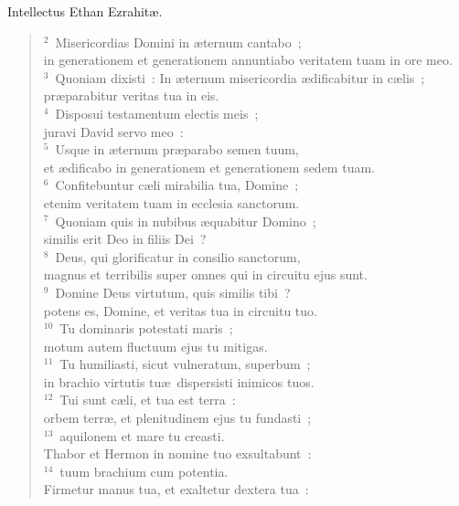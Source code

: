 \bchapter
\lettrine[lines=3,image=true,loversize=0.05,lraise=-0.03]{I}{}ntellectus Ethan Ezrahit\ae .
\begin{flushleft}\begin{verse}\vspace{6pt}${}^{2}$~Misericordias Domini in \ae ternum cantabo~;\\ in generationem et generationem annuntiabo veritatem tuam in ore meo.\\
${}^{3}$~Quoniam dixisti~: In \ae ternum misericordia \ae dificabitur in c\ae lis~;\\ pr\ae parabitur veritas tua in eis.\\
${}^{4}$~Disposui testamentum electis meis~;\\ juravi David servo meo~:\\
${}^{5}$~Usque in \ae ternum pr\ae parabo semen tuum,\\ et \ae dificabo in generationem et generationem sedem tuam.\\
${}^{6}$~Confitebuntur c\ae li mirabilia tua, Domine~;\\ etenim veritatem tuam in ecclesia sanctorum.\\
${}^{7}$~Quoniam quis in nubibus \ae quabitur Domino~;\\ similis erit Deo in filiis Dei~?\\
${}^{8}$~Deus, qui glorificatur in consilio sanctorum,\\ magnus et terribilis super omnes qui in circuitu ejus sunt.\\
${}^{9}$~Domine Deus virtutum, quis similis tibi~?\\ potens es, Domine, et veritas tua in circuitu tuo.\\
${}^{10}$~Tu dominaris potestati maris~;\\ motum autem fluctuum ejus tu mitigas.\\
${}^{11}$~Tu humiliasti, sicut vulneratum, superbum~;\\ in brachio virtutis tu\ae\ dispersisti inimicos tuos.\\
${}^{12}$~Tui sunt c\ae li, et tua est terra~:\\ orbem terr\ae , et plenitudinem ejus tu fundasti~;\\
${}^{13}$~aquilonem et mare tu creasti.\\ Thabor et Hermon in nomine tuo exsultabunt~:\\
${}^{14}$~tuum brachium cum potentia.\\ Firmetur manus tua, et exaltetur dextera tua~:\\

\end{verse}
\end{flushleft}
